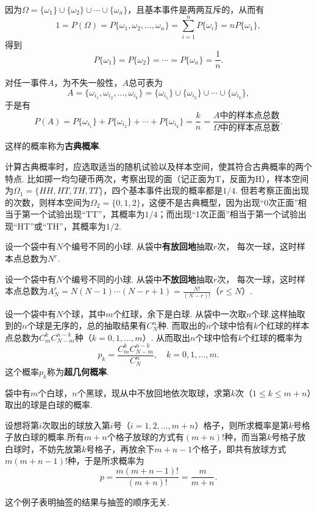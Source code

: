 因为\(\Omega = \{\omega_1\}\cup\{\omega_2\}\cup\dotsb\cup\{\omega_n\}\)，且基本事件是两两互斥的，从而有\[
1 = P(\Omega) = P\{\omega_1, \omega_2, \dotsc, \omega_n\}
= \sum\limits_{i=1}^n P\{\omega_i\}
= n P\{\omega_1\},
\]得到\[
P\{\omega_1\} = P\{\omega_2\} = \dotsb = P\{\omega_n\} = \frac{1}{n}.
\]

对任一事件\(A\)，为不失一般性，\(A\)总可表为\[
A = \{\omega_{i_1},\omega_{i_2},\dotsc,\omega_{i_k}\}
= \{\omega_{i_1}\}\cup\{\omega_{i_2}\}\cup\dotsb\cup\{\omega_{i_k}\},
\]于是有\[
P(A) = P\{\omega_{i_1}\} + P\{\omega_{i_2}\} + \dotsb + P\{\omega_{i_k}\}
= \frac{k}{n} = \frac{A \text{中的样本点总数}}{\Omega \text{中的样本点总数}}.
\]

这样的概率称为\textbf{古典概率}.

计算古典概率时，应选取适当的随机试验以及样本空间，使其符合古典概率的两个特点.
比如掷一均匀硬币两次，考察出现的面（记正面为T，反面为H），样本空间为\(\Omega_1 = \{ HH, HT, TH, TT \}\)，四个基本事件出现的概率都是\(1/4\).
但若考察正面出现的次数，则样本空间为\(\Omega_2 = \{ 0,1,2 \}\)，这便不是古典概型，因为出现“0次正面”相当于第一个试验出现“TT”，其概率为\(1/4\)；而出现“1次正面”相当于第一个试验出现“HT”或“TH”，其概率为\(1/2\).

\begin{example}
设一个袋中有\(N\)个编号不同的小球.
从袋中\textbf{有放回地}抽取\(r\)次，%
每次一球，这时样本点总数为\(N^r\).
\end{example}

\begin{example}
设一个袋中有\(N\)个编号不同的小球.
从袋中\textbf{不放回地}抽取\(r\)次，%
每次一球，这时样本点总数为\(A_N^r = N(N-1)\dotsb(N-r+1) = \frac{N!}{(N-r)!}\)（\(r \leqslant N\)）.
\end{example}

\begin{example}
设一个袋中有\(N\)个球，其中\(m\)个红球，余下是白球.
从袋中一次取\(n\)个球.这样抽取到的\(n\)个球是无序的，总的抽取结果有\(C_N^n\)种.
而取出的\(n\)个球中恰有\(k\)个红球的样本点总数为\(C_m^k C_{N-m}^{n-k}\)种（\(k=0,1,\dotsc,m\)）.
从而取出\(n\)个球中恰有\(k\)个红球的概率为\[
p_k = \frac{C_m^k C_{N-m}^{n-k}}{C_N^n},
\quad k=0,1,\dotsc,m.
\]
这个概率\(p_k\)称为\textbf{超几何概率}.
\end{example}

\begin{example}[抽签问题]
袋中有\(m\)个白球，\(n\)个黑球，现从中不放回地依次取球，求第\(k\)次（\(1 \leqslant k \leqslant m+n\)）取出的球是白球的概率.
\begin{solution}
设想将第\(i\)次取出的球放入第\(i\)号（\(i=1,2,\dotsc,m+n\)）格子，则所求概率是第\(k\)号格子放白球的概率.所有\(m+n\)个格子放球的方式有\((m+n)!\)种，而当第\(k\)号格子放白球时，不妨先放第\(k\)号格子，再放余下\(m+n-1\)个格子，即共有放球方式\(m(m+n-1)!\)种，于是所求概率为\[
p = \frac{m (m+n-1)!}{(m+n)!} = \frac{m}{m+n}.
\]
\end{solution}
这个例子表明抽签的结果与抽签的顺序无关.
\end{example}

